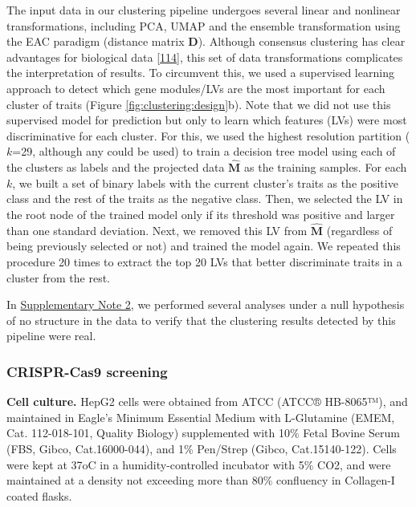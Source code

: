 \documentclass[
        11pt,
]{article}
\begin{document}
The input data in our clustering pipeline undergoes several linear and nonlinear transformations, including PCA, UMAP and the ensemble transformation using the EAC paradigm (distance matrix \(\mathbf{D}\)).
Although consensus clustering has clear advantages for biological data {[}\protect\hyperlink{ref-S7LBsfcF}{114}{]}, this set of data transformations complicates the interpretation of results.
To circumvent this, we used a supervised learning approach to detect which gene modules/LVs are the most important for each cluster of traits (Figure \ref{fig:clustering:design}b).
Note that we did not use this supervised model for prediction but only to learn which features (LVs) were most discriminative for each cluster.
For this, we used the highest resolution partition (\(k\)=29, although any could be used) to train a decision tree model using each of the clusters as labels and the projected data \(\hat{\mathbf{M}}\) as the training samples.
For each \(k\), we built a set of binary labels with the current cluster's traits as the positive class and the rest of the traits as the negative class.
Then, we selected the LV in the root node of the trained model only if its threshold was positive and larger than one standard deviation.
Next, we removed this LV from \(\hat{\mathbf{M}}\) (regardless of being previously selected or not) and trained the model again.
We repeated this procedure 20 times to extract the top 20 LVs that better discriminate traits in a cluster from the rest.

In \protect\hyperlink{sm:clustering:null_sim}{Supplementary Note 2}, we performed several analyses under a null hypothesis of no structure in the data to verify that the clustering results detected by this pipeline were real.

\hypertarget{sec:methods:crispr}{%
\subsubsection{CRISPR-Cas9 screening}\label{sec:methods:crispr}}

\textbf{Cell culture.}
HepG2 cells were obtained from ATCC (ATCC® HB-8065™), and maintained in Eagle's Minimum Essential Medium with L-Glutamine (EMEM, Cat. 112-018-101, Quality Biology) supplemented with 10\% Fetal Bovine Serum (FBS, Gibco, Cat.16000-044), and 1\% Pen/Strep (Gibco, Cat.15140-122).
Cells were kept at 37oC in a humidity-controlled incubator with 5\% CO2, and were maintained at a density not exceeding more than 80\% confluency in Collagen-I coated flasks.
\end{document}
